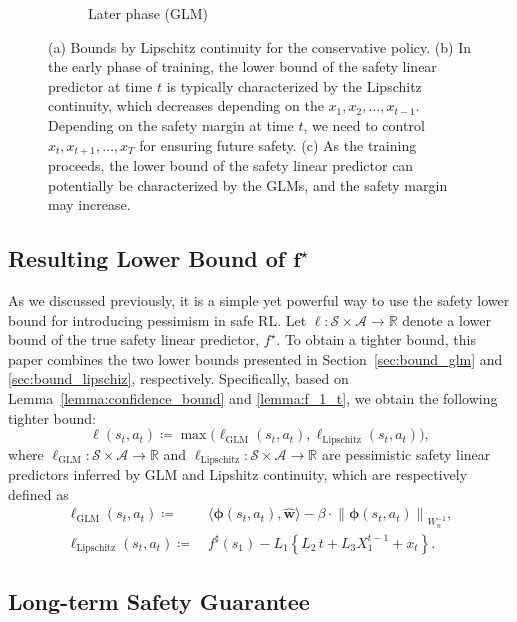 \documentclass[letterpaper]{article} %
\newcommand{\R}{\mathbb{R}}
\newcommand{\cA}{\mathcal{A}}
\newcommand{\cS}{\mathcal{S}}
\newcommand{\bphi}{\bm{\phi}}
\newcommand{\iprod}[2]{\langle #1, #2 \rangle}
\newcommand{\onlynorm}[1]{\left\|{#1}\right\|}
\begin{document}
\begin{figure}[t]
\begin{subfigure}[b]{0.33\textwidth}
        \caption{Later phase (GLM)}
        \label{fig:point_maxcost}
    \end{subfigure}
    \caption{(a) Bounds by Lipschitz continuity for the conservative policy. (b) In the early phase of training, the lower bound of the safety linear predictor at time $t$ is typically characterized by the Lipschitz continuity, which decreases depending on the $x_1, x_2, \ldots, x_{t-1}$. Depending on the safety margin at time $t$, we need to control $x_{t}, x_{t+1}, \ldots, x_T$ for ensuring future safety. (c) As the training proceeds, the lower bound of the safety linear predictor can potentially be characterized by the GLMs, and the safety margin may increase.}
    \label{fig:long_term_safety}
\end{figure}

\subsection{Resulting Lower Bound of $\bm{f^\star}$}

As we discussed previously, it is a simple yet powerful way to use the safety lower bound for introducing pessimism in safe RL.
Let $\ell: \cS \times \cA \rightarrow \R$ denote a lower bound of the true safety linear predictor, $f^\star$.
%
To obtain a tighter bound, this paper combines the two lower bounds presented in Section~\ref{sec:bound_glm} and \ref{sec:bound_lipschiz}, respectively.
Specifically, based on Lemma~\ref{lemma:confidence_bound} and \ref{lemma:f_1_t}, we obtain the following tighter bound:
%
\begin{equation}
    \ell(s_t, a_t) \coloneqq \max \bigl(\ell_\text{GLM}(s_t, a_t), \ell_\text{Lipschitz}(s_t, a_t) \bigr),
\end{equation}
%
where $\ell_\text{GLM}: \cS \times \cA \rightarrow \R$ and $\ell_\text{Lipschitz}: \cS \times \cA \rightarrow \R$ are pessimistic safety linear predictors inferred by GLM and Lipshitz continuity, which are respectively defined as
%
\begin{align*}
    \ell_\text{GLM}(s_t, a_t)
    \coloneqq &\ \iprod{\bphi(s_t, a_t)}{\hat{\bm{w}}} - \beta \cdot \onlynorm{\bphi(s_t, a_t)}_{W_n^{-1}}, \\
    \ell_\text{Lipschitz}(s_t, a_t)
    \coloneqq &\ f^\sharp(s_1) - L_1 \left\{L_2\, t + L_3 X_{1}^{t-1} + x_{t} \right\}.
\end{align*}

\subsection{Long-term Safety Guarantee}
\end{document}

